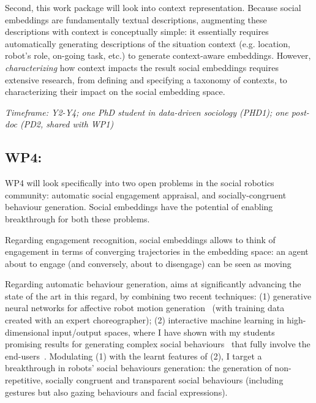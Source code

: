 Second, this work package will look into context representation. Because social
embeddings are fundamentally textual descriptions, augmenting these descriptions
with context is conceptually simple: it essentially requires automatically
generating descriptions of the situation context (e.g. location, robot's role,
on-going task, etc.) to generate context-aware embeddings. However,
\emph{characterizing} how context impacts the result social embeddings requires
extensive research, from defining and specifying a taxonomy of contexts, to
characterizing their impact on the social embedding space.


\vspace{1em}
\noindent\emph{Timeframe: Y2-Y4; one PhD student in data-driven sociology
    (PHD1); one post-doc (PD2, shared with WP1)}

\subsection{WP4: \textbf{\wpFour}}

WP4 will look specifically into two open problems in the
social robotics community: automatic social engagement appraisal, and
socially-congruent behaviour generation. Social embeddings have the potential of
enabling breakthrough for both these problems.

Regarding engagement recognition, social embeddings allows to think of
engagement in terms of converging trajectories in the embedding space: an agent
about to engage (and conversely, about to disengage) can be seen as moving

Regarding automatic behaviour generation, \project aims at significantly
advancing the state of the art in this regard, by combining two recent
techniques: (1) generative neural networks for affective robot motion
generation~\cite{marmpena2019generating,suguitan2020moveae} (with training data
created with an expert choreographer); (2) interactive machine learning in
high-dimensional input/output spaces, where I have shown with my students
promising results for generating complex social
behaviours~\cite{senft2019teaching, winkle2020couch} that fully involve the
end-users~\cite{winkle2018social}. Modulating (1) with the learnt features of
(2), I target a breakthrough in robots' social behaviours generation: the
generation of non-repetitive, socially congruent and transparent social
behaviours (including gestures but also gazing behaviours and facial
expressions).

